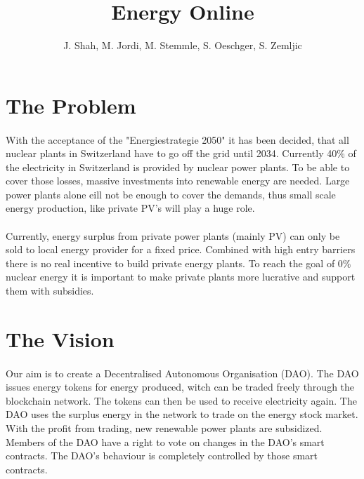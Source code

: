 \documentclass{scrartcl}
\begin{document}
	
	\title{Energy Online}
	\subtitle{}
	\author{J. Shah, M. Jordi, M. Stemmle, S. Oeschger, S. Zemljic}
	
	\maketitle
	
	\section{The Problem}
	
	\paragraph{}
	With the acceptance of the "Energiestrategie 2050" it has been decided, that all nuclear plants in Switzerland have to go off the grid until 2034. Currently 40\% of the electricity in Switzerland is provided by nuclear power plants. To be able to cover those losses, massive investments into renewable energy are needed. Large power plants alone eill not be enough to cover the demands, thus small scale energy production, like private PV's will play a huge role.
	
	\paragraph{}
	Currently, energy surplus from private power plants (mainly PV) can only be sold to local energy provider for a fixed price. Combined with high entry barriers there is no real incentive to build private energy plants.
	To reach the goal of 0\% nuclear energy it is important to make private plants more lucrative and support them with subsidies. 
	
	\section{The Vision}
	
	\paragraph{}
	Our aim is to create a Decentralised Autonomous Organisation (DAO). The DAO issues energy tokens for energy produced, witch can be traded freely through the blockchain network. The tokens can then be used to receive electricity again. The DAO uses the surplus energy in the network to trade on the energy stock market. With the profit from trading, new renewable power plants are subsidized. Members of the DAO have a right to vote on changes in the DAO's smart contracts. The DAO's behaviour is completely controlled by those smart contracts.
	
\end{document}
